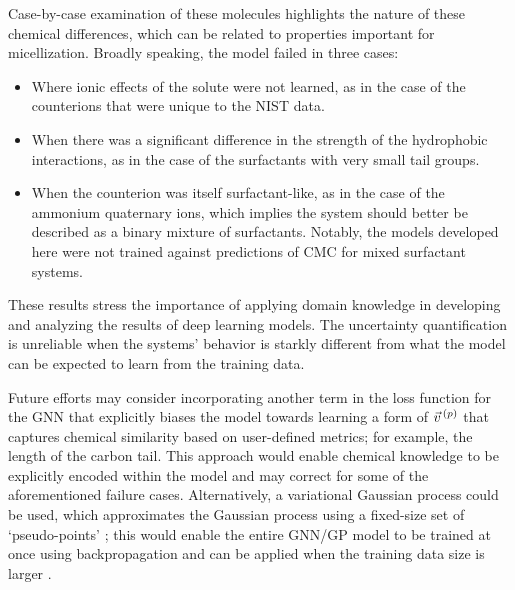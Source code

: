 Case-by-case examination of these molecules highlights the nature of these
chemical differences, which can be related to properties important for
micellization. Broadly speaking, the model failed in three cases:
\begin{itemize}
    \item Where ionic effects of the solute were not learned, as in the case of the counterions that were unique to the NIST data.
    \item When there was a significant difference in the strength of the
          hydrophobic interactions, as in the case of the surfactants with very small
          tail groups.
    \item When the counterion was itself surfactant-like, as in the case of the
          ammonium quaternary ions, which implies the system should better be
          described as a binary mixture of surfactants. Notably, the models
          developed here were not trained against predictions of CMC for mixed
          surfactant systems.
\end{itemize}
These results stress the importance of applying domain knowledge in developing
and analyzing the results of deep learning models. The uncertainty
quantification is unreliable when the systems' behavior is starkly different
from what the model can be expected to learn from the training data.

Future efforts may consider incorporating another term in the loss function for
the GNN that explicitly biases the model towards learning a form of $\vec{v}^{\,(p)}{}$
that captures chemical similarity based on user-defined metrics; for example,
the length of the carbon tail. This approach would enable chemical knowledge to
be explicitly encoded within the model and may correct for some of the
aforementioned failure cases. Alternatively, a variational Gaussian process
could be used, which approximates the Gaussian process using a fixed-size set of
`pseudo-points' \cite{hensmanGaussianProcessesBig2013}; this would enable the
entire GNN/GP model to be trained at once using backpropagation and can be
applied when the training data size is larger
\cite{moriartyUnlockNNUncertaintyQuantification2022}.